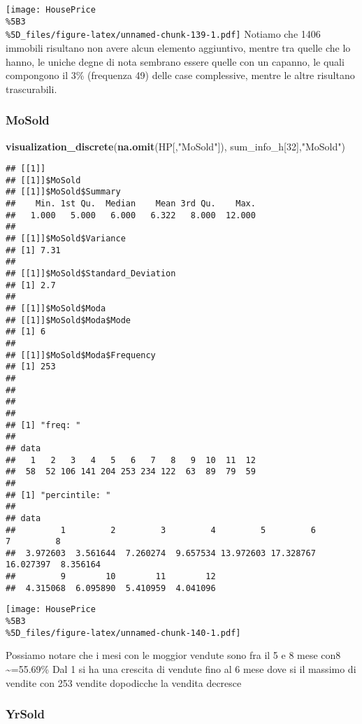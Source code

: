 \documentclass[
]{article}
\newenvironment{Shaded}{\begin{snugshade}}{\end{snugshade}}
\newcommand{\DecValTok}[1]{\textcolor[rgb]{0.00,0.00,0.81}{#1}}
\newcommand{\FunctionTok}[1]{\textcolor[rgb]{0.13,0.29,0.53}{\textbf{#1}}}
\newcommand{\NormalTok}[1]{#1}
\newcommand{\StringTok}[1]{\textcolor[rgb]{0.31,0.60,0.02}{#1}}
\begin{document}
\texttt{[image: HousePrice\\\%5B3\\\%5D\_files/figure-latex/unnamed-chunk-139-1.pdf]}
Notiamo che 1406 immobili risultano non avere alcun elemento aggiuntivo,
mentre tra quelle che lo hanno, le uniche degne di nota sembrano essere
quelle con un capanno, le quali compongono il 3\% (frequenza 49) delle
case complessive, mentre le altre risultano trascurabili.

\subsubsection{MoSold}\label{mosold}

\begin{Shaded}
\begin{Highlighting}[]
\FunctionTok{visualization\_discrete}\NormalTok{(}\FunctionTok{na.omit}\NormalTok{(HP[,}\StringTok{"MoSold"}\NormalTok{]), sum\_info\_h[}\DecValTok{32}\NormalTok{],}\StringTok{"MoSold"}\NormalTok{)}
\end{Highlighting}
\end{Shaded}

\begin{verbatim}
## [[1]]
## [[1]]$MoSold
## [[1]]$MoSold$Summary
##    Min. 1st Qu.  Median    Mean 3rd Qu.    Max. 
##   1.000   5.000   6.000   6.322   8.000  12.000 
## 
## [[1]]$MoSold$Variance
## [1] 7.31
## 
## [[1]]$MoSold$Standard_Deviation
## [1] 2.7
## 
## [[1]]$MoSold$Moda
## [[1]]$MoSold$Moda$Mode
## [1] 6
## 
## [[1]]$MoSold$Moda$Frequency
## [1] 253
## 
## 
## 
## 
## [1] "freq: "
## 
## data
##   1   2   3   4   5   6   7   8   9  10  11  12 
##  58  52 106 141 204 253 234 122  63  89  79  59 
## 
## [1] "percintile: "
## 
## data
##         1         2         3         4         5         6         7         8 
##  3.972603  3.561644  7.260274  9.657534 13.972603 17.328767 16.027397  8.356164 
##         9        10        11        12 
##  4.315068  6.095890  5.410959  4.041096
\end{verbatim}

\texttt{[image: HousePrice\\\%5B3\\\%5D\_files/figure-latex/unnamed-chunk-140-1.pdf]}

Possiamo notare che i mesi con le moggior vendute sono fra il 5 e 8 mese
con8 \textasciitilde=55.69\% Dal 1 si ha una crescita di vendute fino al
6 mese dove si il massimo di vendite con 253 vendite dopodicche la
vendita decresce

\subsubsection{YrSold}\label{yrsold}
\end{document}
